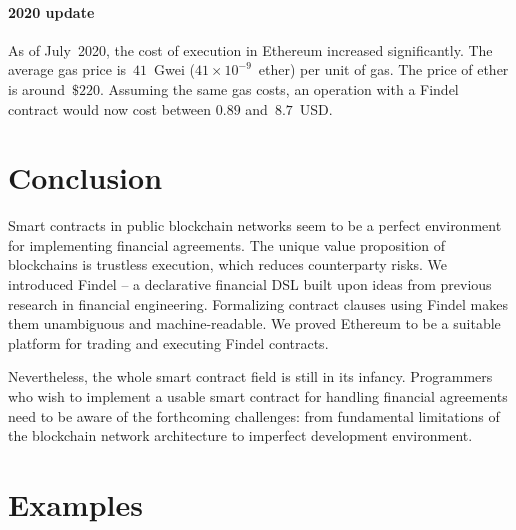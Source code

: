 \paragraph{2020 update}
As of July~2020, the cost of execution in Ethereum increased significantly.
The average gas price is~$41$~Gwei ($41 \times 10^{-9}$~ether) per unit of gas.
The price of ether is around~$\$220$.
Assuming the same gas costs, an operation with a Findel contract would now cost between $0.89$ and~$8.7$~USD.


\section{Conclusion}

Smart contracts in public blockchain networks seem to be a perfect environment for implementing financial agreements.
The unique value proposition of blockchains is trustless execution, which reduces counterparty risks.
We introduced Findel -- a declarative financial DSL built upon ideas from previous research in financial engineering.
Formalizing contract clauses using Findel makes them unambiguous and machine-readable.
We proved Ethereum to be a suitable platform for trading and executing Findel contracts.

Nevertheless, the whole smart contract field is still in its infancy.
Programmers who wish to implement a usable smart contract for handling financial agreements need to be aware of the forthcoming challenges: from fundamental limitations of the blockchain network architecture to imperfect development environment.


\section{Examples} \label{sec:Ch10FindelExamples}

